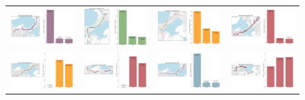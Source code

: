 \documentclass[b4paper]{article}
\begin{document}
\begin{figure}
\begin{center}
\begin{tabular}{ cccc }

  \includegraphics[width=44mm]{Route_2.png}  &   \includegraphics[width=44mm]{Route_4.png}  & \includegraphics[width=44mm]{Route_5.png}  & \includegraphics[width=44mm]{Route_6.png} \\
  
  \includegraphics[width=44mm]{Route_7.png}  &   \includegraphics[width=44mm]{Route_8.png}  & \includegraphics[width=44mm]{Route_10.png}  & \includegraphics[width=44mm]{Route_11.png} \\


\end{tabular}
\end{center}
\end{figure}
\end{document}
